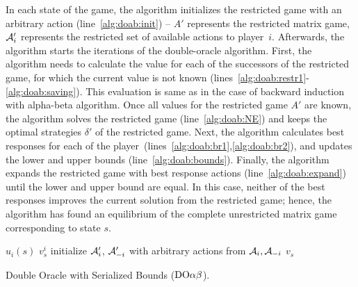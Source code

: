 In each state of the game, the algorithm initializes the restricted game with an arbitrary action (line~\ref{alg:doab:init}) -- $A'$ represents the restricted matrix game, $\mathcal{A}'_i$ represents the restricted set of available actions to player~$i$. 
Afterwards, the algorithm starts the iterations of the double-oracle algorithm.
First, the algorithm needs to calculate the value for each of the successors of the restricted game, for which the current value is not known (lines~\ref{alg:doab:restr1}-\ref{alg:doab:saving}). This evaluation is same as in the case of backward induction with alpha-beta algorithm. 
Once all values for the restricted game $A'$ are known, the algorithm solves the restricted game (line~\ref{alg:doab:NE}) and keeps the optimal strategies $\delta'$ of the restricted game. 
Next, the algorithm calculates best responses for each of the player~(lines~\ref{alg:doab:br1},\ref{alg:doab:br2}), and updates the lower and upper bounds (line~\ref{alg:doab:bounds}). Finally, the algorithm expands the restricted game with best response actions (line~\ref{alg:doab:expand}) until the lower and upper bound are equal. In this case, neither of the best responses improves the current solution from the restricted game; hence, the algorithm has found an equilibrium of the complete unrestricted matrix game corresponding to state $s$.

\begin{algorithm2e}[t!]
\small
{}
 {\Return $u_i(s)$} \label{alg:doab:stop1}
 {
	\Return $v_s^{i}$
}
initialize $\mathcal{A}'_i$, $\mathcal{A}'_{-i}$ with arbitrary actions from $\mathcal{A}_i, \mathcal{A}_{-i}$\; \label{alg:doab:init}
\Return $v_s$ \label{alg:doab:stop2}
\caption{Double Oracle with Serialized Bounds ($\textrm{DO}\alpha\beta$).} \label{alg:doab}
\end{algorithm2e}


